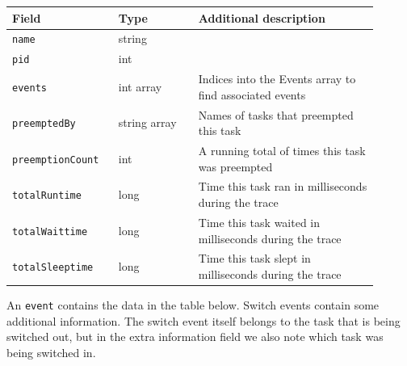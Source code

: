 \documentclass{hmcclinic}
\begin{document}
  \begin{center}
    \begin{tabular}{p{0.25\linewidth}p{0.2\linewidth}p{0.45\linewidth}}
      \toprule
      \textbf{Field}           & \textbf{Type}         & \textbf{Additional
      description} \\
      \midrule
       \texttt{name}            & string       & \\
       \texttt{pid}             & int          & \\
       \texttt{events}          & int array    & Indices into the Events array to find associated events\\
       \texttt{preemptedBy}     & string array & Names of tasks that preempted this task \\
      \texttt{preemptionCount} & int          & A running total of times this task was preempted                    \\
       \texttt{totalRuntime}    & long         & Time this task ran in milliseconds during the trace        \\
       \texttt{totalWaittime}   & long         & Time this task waited in milliseconds during the trace     \\
       \texttt{totalSleeptime}  & long         & Time this task slept in milliseconds during the trace\\
      \bottomrule
    \end{tabular}
  \end{center}

  An \texttt{event} contains the data in the table below. Switch events contain some additional
  information. The switch event itself belongs to the task that is being
  switched out, but in the extra information field we also note which task
  was being switched in.
\end{document}
